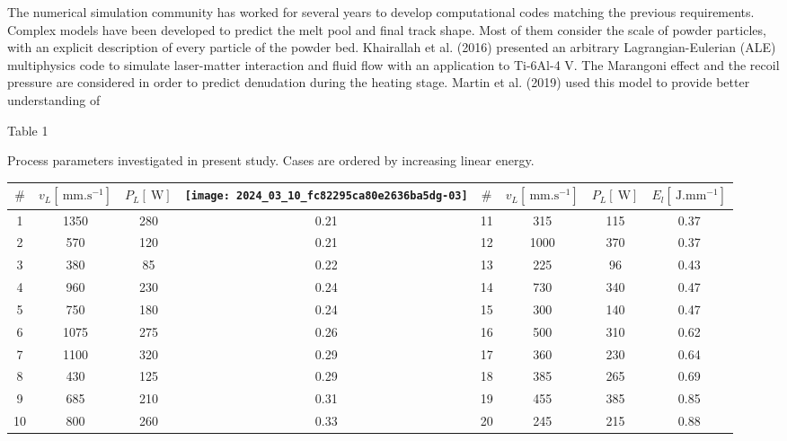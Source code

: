 \documentclass[10pt]{article}
\begin{document}
The numerical simulation community has worked for several years to develop computational codes matching the previous requirements. Complex models have been developed to predict the melt pool and final track shape. Most of them consider the scale of powder particles, with an explicit description of every particle of the powder bed. Khairallah et al. (2016) presented an arbitrary Lagrangian-Eulerian (ALE) multiphysics code to simulate laser-matter interaction and fluid flow with an application to Ti-6Al-4 V. The Marangoni effect and the recoil pressure are considered in order to predict denudation during the heating stage. Martin et al. (2019) used this model to provide better understanding of

Table 1

Process parameters investigated in present study. Cases are ordered by increasing linear energy.

\begin{center}
\begin{tabular}{|c|c|c|c|c|c|c|c|}
\hline
$\#$ & $v_{L}\left[\mathrm{~mm} . \mathrm{s}^{-1}\right]$ & $P_{L}[\mathrm{~W}]$ & \texttt{[image: 2024\_03\_10\_fc82295ca80e2636ba5dg-03]}
 & $\#$ & $v_{L}\left[\mathrm{~mm} . \mathrm{s}^{-1}\right]$ & $P_{L}[\mathrm{~W}]$ & $E_{l}\left[\mathrm{~J} . \mathrm{mm}^{-1}\right]$ \\
\hline
1 & 1350 & 280 & 0.21 & 11 & 315 & 115 & 0.37 \\
\hline
2 & 570 & 120 & 0.21 & 12 & 1000 & 370 & 0.37 \\
\hline
3 & 380 & 85 & 0.22 & 13 & 225 & 96 & 0.43 \\
\hline
4 & 960 & 230 & 0.24 & 14 & 730 & 340 & 0.47 \\
\hline
5 & 750 & 180 & 0.24 & 15 & 300 & 140 & 0.47 \\
\hline
6 & 1075 & 275 & 0.26 & 16 & 500 & 310 & 0.62 \\
\hline
7 & 1100 & 320 & 0.29 & 17 & 360 & 230 & 0.64 \\
\hline
8 & 430 & 125 & 0.29 & 18 & 385 & 265 & 0.69 \\
\hline
9 & 685 & 210 & 0.31 & 19 & 455 & 385 & 0.85 \\
\hline
10 & 800 & 260 & 0.33 & 20 & 245 & 215 & 0.88 \\
\hline
\end{tabular}
\end{center}
\end{document}
